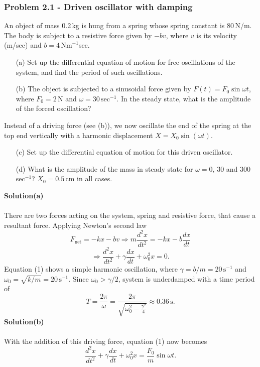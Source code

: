 \documentclass[12pt,a4paper]{article}
\begin{document}
\subsubsection*{Problem 2.1 - Driven oscillator with damping}
An object of mass 0.2\,kg is hung from a spring whose spring constant is 80\,N/m. The body is subject to a resistive force given by $-bv$, where $v$ is its velocity (m/sec) and $b=4\,\text{Nm}^{-1}$sec.
\begin{enumerate}
    \item[(a)]Set up the differential equation of motion for free oscillations of the system, and find the period of such oscillations.
    \item[(b)]The object is subjected to a sinusoidal force given by $F(t)=F_0\sin\omega t$, where $F_0=2$\,N and $\omega=30\,\text{sec}^{-1}$. In the steady state, what is the amplitude of the forced oscillation?
\end{enumerate}
Instead of a driving force (see (b)), we now oscillate the end of the spring at the top end vertically with a harmonic displacement $X=X_0\sin(\omega t)$.
\begin{enumerate}
    \item[(c)]Set up the differential equation of motion for this driven oscillator.
    \item[(d)]What is the amplitude of the mass in steady state for $\omega=0$, 30 and 300 sec$^{-1}$? $X_0=0.5$\,cm in all cases.
\end{enumerate}
\textbf{Solution(a)}
\\
\\There are two forces acting on the system, spring and resistive force, that cause a resultant force. Applying Newton's second law
\[F_{\text{net}}=-kx-bv\Rightarrow m\frac{d^2x}{dt^2}=-kx-b\frac{dx}{dt}\]
\begin{equation}
    \Rightarrow \frac{d^2x}{dt^2}+\gamma\frac{dx}{dt}+\omega_0^2x=0.
\end{equation}
Equation (1) shows a simple harmonic oscillation, where $\gamma=b/m=20\,\text{s}^{-1}$ and $\omega_0=\sqrt{k/m}=20\,\text{s}^{-1}$. Since $\omega_0>\gamma/2$, system is underdamped with a time period of
\[T=\frac{2\pi}{\omega}=\frac{2\pi}{\sqrt{\omega_0^2-\frac{\gamma^2}{4}}}\approx0.36\,\text{s}.\]
\textbf{Solution(b)}
\\
\\With the addition of this driving force, equation (1) now becomes
\begin{equation}
    \frac{d^2x}{dt^2}+\gamma\frac{dx}{dt}+\omega_0^2x=\frac{F_0}{m}\sin\omega t.
\end{equation}
\end{document}
